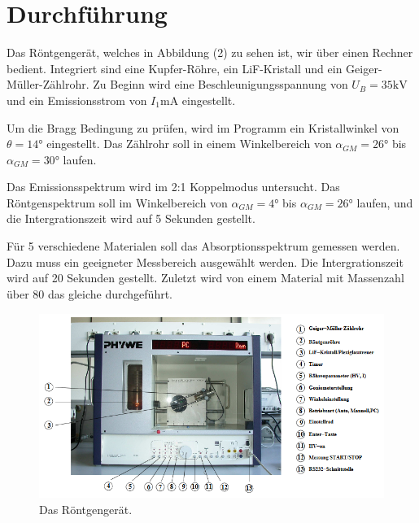 \section{Durchführung}
\label{sec:Durchführung}

Das Röntgengerät, welches in Abbildung (2) zu sehen ist, wir über einen Rechner bedient.
Integriert sind eine Kupfer-Röhre, ein LiF-Kristall und ein Geiger-Müller-Zählrohr.
Zu Beginn wird eine Beschleunigungsspannung von $U_B = 35 \si{\kV}$ und ein Emissionsstrom von $I_ 1 \si{\mA}$ eingestellt.

\noindent Um die Bragg Bedingung zu prüfen, wird im Programm ein Kristallwinkel von $\theta = 14$° eingestellt. Das Zählrohr
soll in einem Winkelbereich von $\alpha_{GM} =26$° bis $\alpha_{GM} =30$° laufen.

\noindent Das Emissionsspektrum wird im 2:1 Koppelmodus untersucht. Das Röntgenspektrum soll im Winkelbereich von $\alpha_{GM} =4$° bis $\alpha_{GM} =26$° laufen, und die Intergrationszeit wird auf 5 Sekunden gestellt.

\noindent Für 5 verschiedene Materialen soll das Absorptionsspektrum gemessen werden. Dazu muss ein geeigneter Messbereich ausgewählt werden. 
Die Intergrationszeit wird auf 20 Sekunden gestellt. 
Zuletzt wird von einem Material mit Massenzahl über 80 das gleiche durchgeführt. 

\begin{figure}[H]
  \centering
  \includegraphics[height=6cm]{geraet.PNG}
  \caption{Das Röntgengerät. \cite[S.4]{kent}}
\end{figure}